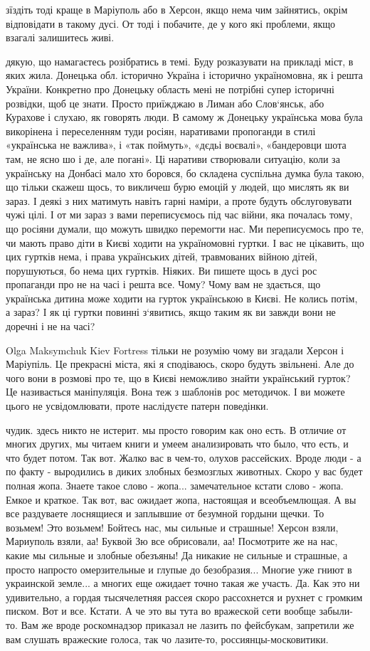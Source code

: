 зїздіть тоді краще в Маріуполь або в Херсон, якщо нема чим зайнятись, окрім
відповідати в такому дусі. От тоді і побачите, де у кого які проблеми, якщо
взагалі залишитесь живі.

дякую, що намагаєтесь розібратись в темі. Буду розказувати на прикладі міст, в
яких жила. Донецька обл. історично Україна і історично україномовна, як і решта
України. Конкретно про Донецьку область мені не потрібні супер історичні
розвідки, щоб це знати. Просто приїжджаю в Лиман або Слов‘янськ, або Курахове і
слухаю, як говорять люди. В самому ж Донецьку українська мова була викорінена і
переселенням туди росіян, наративами пропоганди в стилі «українська не
важлива», і «так поймуть», «дєдьі воєвалі», «бандеровци шота там, не ясно шо і
де, але погані». Ці наративи створювали ситуацію, коли за українську на Донбасі
мало хто боровся, бо складена суспільна думка була такою, що тільки скажеш
щось, то викличеш бурю емоцій у людей, що мислять як ви зараз. І деякі з них
матимуть навіть гарні наміри, а проте будуть обслуговувати чужі цілі. І от ми
зараз з вами переписуємось під час війни, яка почалась тому, що росіяни думали,
що можуть швидко перемогти нас. Ми переписуємось про те, чи мають право діти в
Києві ходити на україномовні гуртки. І вас не цікавить, що цих гуртків нема, і
права українських дітей, травмованих війною дітей, порушуються, бо нема цих
гуртків. Ніяких. Ви пишете щось в дусі рос пропаганди про не на часі і решта
все. Чому? Чому вам не здається, що українська дитина може ходити на гурток
українською в Києві. Не колись потім, а зараз? І як ці гуртки повинні
з‘явитись, якщо таким як ви завжди вони не доречні і не на часі?

Olga Maksymchuk Kiev Fortress тільки не розумію чому ви згадали Херсон і
Маріупіль. Це прекрасні міста, які я сподіваюсь, скоро будуть звільнені. Але до
чого вони в розмові про те, що в Києві неможливо знайти український гурток? Це
називається маніпуляція. Вона теж з шаблонів рос методичок. І ви можете цього
не усвідомлювати, проте наслідуєте патерн поведінки.

чудик. здесь никто не истерит. мы просто говорим как оно есть. В отличие от
многих других, мы читаем книги и умеем анализировать что было, что есть, и что
будет потом. Так вот. Жалко вас в чем-то, олухов рассейских. Вроде люди - а по
факту - выродились в диких злобных безмозглых животных. Скоро у вас будет
полная жопа. Знаете такое слово - жопа... замечательное кстати слово - жопа.
Емкое и краткое. Так вот, вас ожидает жопа, настоящая и всеобъемлющая. А вы все
раздуваете лоснящиеся и заплывшие от безумной гордыни щечки. То возьмем! Это
возьмем! Бойтесь нас, мы сильные и страшные! Херсон взяли, Мариуполь взяли, аа!
Буквой Зю все обрисовали, аа! Посмотрите же на нас, какие мы сильные и злобные
обезъяны! Да никакие не сильные и страшные, а просто напросто омерзительные и
глупые до безобразия... Многие уже гниют в украинской земле... а многих еще
ожидает точно такая же участь. Да. Как это ни удивительно, а гордая
тысячелетняя рассея скоро рассохнется и рухнет с громким писком. Вот и все.
Кстати. А че это вы тута во вражеской сети вообще забыли-то. Вам же вроде
роскомнадзор приказал не лазить по фейсбукам, запретили же вам слушать
вражеские голоса, так чо лазите-то, россиянцы-московитики.

